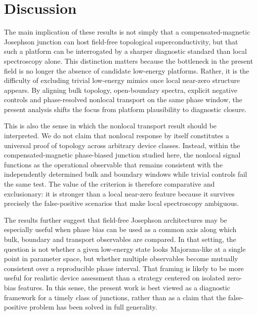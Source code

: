 \section*{Discussion}

The main implication of these results is not simply that a compensated-magnetic Josephson junction can host field-free topological superconductivity, but that such a platform can be interrogated by a sharper diagnostic standard than local spectroscopy alone. This distinction matters because the bottleneck in the present field is no longer the absence of candidate low-energy platforms. Rather, it is the difficulty of excluding trivial low-energy mimics once local near-zero structure appears. By aligning bulk topology, open-boundary spectra, explicit negative controls and phase-resolved nonlocal transport on the same phase window, the present analysis shifts the focus from platform plausibility to diagnostic closure.

This is also the sense in which the nonlocal transport result should be interpreted. We do not claim that nonlocal response by itself constitutes a universal proof of topology across arbitrary device classes. Instead, within the compensated-magnetic phase-biased junction studied here, the nonlocal signal functions as the operational observable that remains consistent with the independently determined bulk and boundary windows while trivial controls fail the same test. The value of the criterion is therefore comparative and exclusionary: it is stronger than a local near-zero feature because it survives precisely the false-positive scenarios that make local spectroscopy ambiguous.

The results further suggest that field-free Josephson architectures may be especially useful when phase bias can be used as a common axis along which bulk, boundary and transport observables are compared. In that setting, the question is not whether a given low-energy state looks Majorana-like at a single point in parameter space, but whether multiple observables become mutually consistent over a reproducible phase interval. That framing is likely to be more useful for realistic device assessment than a strategy centered on isolated zero-bias features. In this sense, the present work is best viewed as a diagnostic framework for a timely class of junctions, rather than as a claim that the false-positive problem has been solved in full generality.

